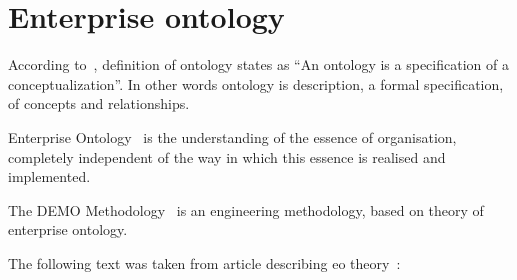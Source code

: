 \section{Enterprise ontology}
According to~\cite{gruber-translation-1993}, definition of ontology states as ``An ontology is a specification of a conceptualization''. In other words ontology is description, a formal specification, of concepts and relationships.

Enterprise Ontology~\cite{dietz-essence-2015} is the understanding of the essence of organisation, completely independent of the way in which this essence is realised and implemented.

The DEMO Methodology~\cite{dietz-enterprise-2006} is an engineering methodology, based on theory of enterprise ontology.

The following text was taken from article describing \gls{eo} theory~\cite{haan-modeling-2009}:

